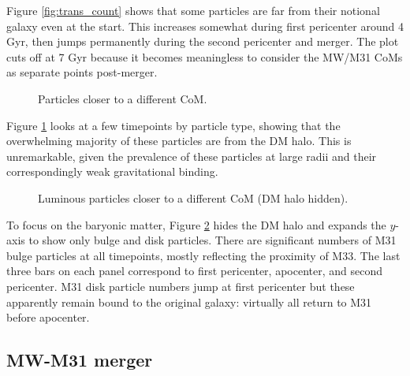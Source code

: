 \documentclass[twocolumn]{aastex63}
\begin{document}
Figure \ref{fig:trans_count} shows that some particles are far from their notional galaxy even at the start. This increases somewhat during first pericenter around 4 Gyr, then jumps permanently during the second pericenter and merger. The plot cuts off at 7 Gyr because it becomes meaningless to consider the MW/M31 CoMs as separate points post-merger.

\begin{figure}[htb!]
	\caption{Particles closer to a different CoM.
		\label{fig:trans_p}}
\end{figure}

Figure \ref{fig:trans_p} looks at a few timepoints by particle type, showing that the overwhelming majority of these particles are from the DM halo. This is unremarkable, given the prevalence of these particles at large radii and their correspondingly weak gravitational binding.

\begin{figure}[htb!]
	\caption{Luminous particles closer to a different CoM (DM halo hidden).
		\label{fig:trans_l}}
\end{figure}

To focus on the baryonic matter, Figure \ref{fig:trans_l} hides the DM halo and expands the $y$-axis to show only bulge and disk particles. There are significant numbers of M31 bulge particles at all timepoints, mostly reflecting the proximity of M33. The last three bars on each panel correspond to first pericenter, apocenter, and second pericenter. M31 disk particle numbers jump at first pericenter but these apparently remain bound to the original galaxy: virtually all return to M31 before apocenter.


\subsection{MW-M31 merger}

\end{document}

